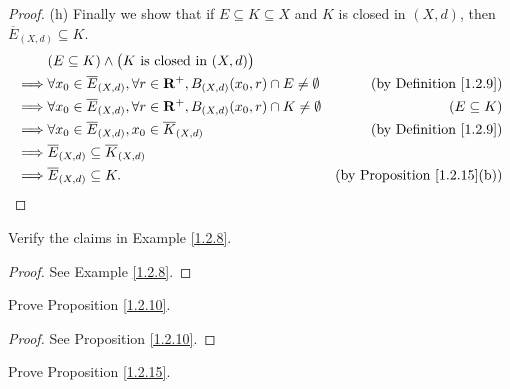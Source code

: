 \begin{proof}{(h)}
    Finally we show that if \(E \subseteq K \subseteq X\) and \(K\) is closed in \((X, d)\), then \(\overline{E}_{(X, d)} \subseteq K\).
    \begin{align*}
                 & (E \subseteq K) \land \big(K \text{ is closed in } (X, d)\big)                                                                                        \\
        \implies & \forall x_0 \in \overline{E}_{(X, d)}, \forall r \in \mathbf{R}^+, B_{(X, d)}(x_0, r) \cap E \neq \emptyset & \text{(by Definition \ref{1.2.9})}      \\
        \implies & \forall x_0 \in \overline{E}_{(X, d)}, \forall r \in \mathbf{R}^+, B_{(X, d)}(x_0, r) \cap K \neq \emptyset & (E \subseteq K)                         \\
        \implies & \forall x_0 \in \overline{E}_{(X, d)}, x_0 \in \overline{K}_{(X, d)}                                        & \text{(by Definition \ref{1.2.9})}      \\
        \implies & \overline{E}_{(X, d)} \subseteq \overline{K}_{(X, d)}                                                                                                 \\
        \implies & \overline{E}_{(X, d)} \subseteq K.                                                                          & \text{(by Proposition \ref{1.2.15}(b))}
    \end{align*}
\end{proof}

\exercisesection

\begin{exercise}\label{ex 1.2.1}
    Verify the claims in Example \ref{1.2.8}.
\end{exercise}

\begin{proof}
    See Example \ref{1.2.8}.
\end{proof}

\begin{exercise}\label{ex 1.2.2}
    Prove Proposition \ref{1.2.10}.
\end{exercise}

\begin{proof}
    See Proposition \ref{1.2.10}.
\end{proof}

\begin{exercise}\label{ex 1.2.3}
    Prove Proposition \ref{1.2.15}.
\end{exercise}

